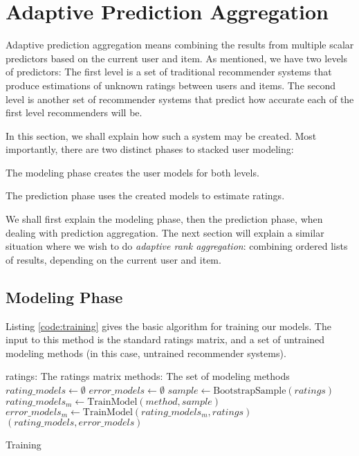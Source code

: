 \section{Adaptive Prediction Aggregation}

Adaptive prediction aggregation means combining the results
from multiple scalar predictors based on the current user and item.
As mentioned, we have two levels of predictors:
The first level is a set of traditional recommender systems
that produce estimations of unknown ratings between users and items.
The second level is another set of recommender systems 
that predict how accurate each of the first level recommenders will be.

In this section, we shall explain how such a system may be created.
Most importantly, there are two distinct phases to stacked user modeling:

\begin{enumerate*}
  \item The modeling phase creates the user models for both levels.
  \item The prediction phase uses the created models to estimate ratings.
\end{enumerate*}

We shall first explain the modeling phase, then the prediction phase,
when dealing with prediction aggregation.
The next section will explain a similar situation where
we wish to do \emph{adaptive rank aggregation}: 
combining ordered lists of results, depending on the current user and item.


\subsection{Modeling Phase}

Listing \ref{code:training} gives the basic algorithm for training
our models. The input to this method is the standard ratings matrix,
and a set of untrained modeling methods (in this case,
untrained recommender systems).

\begin{algorithm}
  \begin{algorithmic}[1]
  \REQUIRE ratings: The ratings matrix
  \REQUIRE methods: The set of modeling methods
  \ENSURE
    \STATE $rating\_models \gets \emptyset$
    \STATE $error\_models \gets \emptyset$
      \STATE $sample \gets \mathrm{BootstrapSample}(ratings)$
      \STATE $rating\_models_m \gets \mathrm{TrainModel}(method, sample)$
      \STATE $error\_models_m  \gets \mathrm{TrainModel}(rating\_models_m, ratings)$
    \ENDFOR 
  \RETURN $(rating\_models, error\_models)$
  \end{algorithmic}
  \caption[Training]{Training
  }
  \label{code:training}
\end{algorithm}

